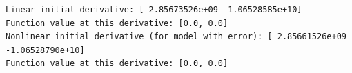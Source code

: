 \documentclass[11pt]{article}
\begin{document}
    \begin{Verbatim}[commandchars=\\\{\}]
Linear initial derivative: [ 2.85673526e+09 -1.06528585e+10]
Function value at this derivative: [0.0, 0.0]
Nonlinear initial derivative (for model with error): [ 2.85661526e+09
-1.06528790e+10]
Function value at this derivative: [0.0, 0.0]
    \end{Verbatim}

    \begin{center}
    \end{center}
    { \hspace*{\fill} \\}
    
    \begin{center}
    \end{center}
    { \hspace*{\fill} \\}
    
\end{document}
